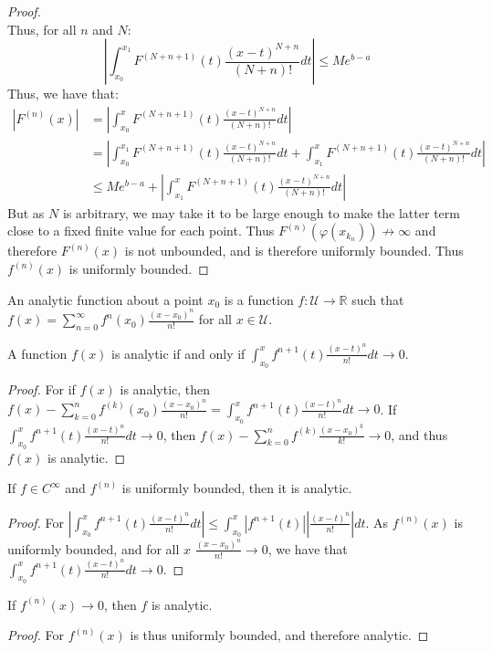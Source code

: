 \begin{proof}
\begin{equation*}
    \end{equation*}
    Thus, for all $n$ and $N$:
    \begin{equation*}
        |\int_{x_0}^{x_1} F^{(N+n+1)}(t)\frac{(x-t)^{N+n}}{(N+n)!}dt|\leq Me^{b-a}
    \end{equation*}
    Thus, we have that:
    \begin{align*}
        |F^{(n)}(x)| &= |\int_{x_0}^{x} F^{(N+n+1)}(t)\frac{(x-t)^{N+n}}{(N+n)!}dt|\\ &= |\int_{x_0}^{x_1} F^{(N+n+1)}(t)\frac{(x-t)^{N+n}}{(N+n)!}dt+\int_{x_1}^{x} F^{(N+n+1)}(t)\frac{(x-t)^{N+n}}{(N+n)!}dt|\\
        &\leq Me^{b-a}+|\int_{x_1}^{x} F^{(N+n+1)}(t)\frac{(x-t)^{N+n}}{(N+n)!}dt|
    \end{align*}
    But as $N$ is arbitrary, we may take it to be large enough to make the latter term close to a fixed finite value for each point. Thus $F^{(n)}(\varphi(x_{k_n}))\not\rightarrow \infty$ and therefore $F^{(n)}(x)$ is not unbounded, and is therefore uniformly bounded. Thus $f^{(n)}(x)$ is uniformly bounded.
    \end{proof}
    \begin{definition}
    An analytic function about a point $x_0$ is a function $f:\mathcal{U}\rightarrow\mathbb{R}$ such that $f(x) = \sum_{n=0}^{\infty} f^{n}(x_0) \frac{(x-x_0)^{n}}{n!}$ for all $x\in\mathcal{U}$.
    \end{definition}
    \begin{theorem}
    A function $f(x)$ is analytic if and only if $\int_{x_0}^{x}f^{n+1}(t)\frac{(x-t)^n}{n!}dt\rightarrow 0$.
    \end{theorem}
    \begin{proof}
    For if $f(x)$ is analytic, then $f(x)-\sum_{k=0}^{n} f^{(k)}(x_0)\frac{(x-x_0)^n}{n!} = \int_{x_0}^{x}f^{n+1}(t)\frac{(x-t)^n}{n!}dt \rightarrow 0$. If $\int_{x_0}^{x}f^{n+1}(t)\frac{(x-t)^n}{n!}dt\rightarrow 0$, then $f(x)-\sum_{k=0}^{n}f^{(k)}\frac{(x-x_0)^{k}}{k!}\rightarrow 0$, and thus $f(x)$ is analytic.
    \end{proof}
    \begin{theorem}
    If $f\in C^{\infty}$ and $f^{(n)}$ is uniformly bounded, then it is analytic.
    \end{theorem}
    \begin{proof}
    For $|\int_{x_0}^{x}f^{n+1}(t)\frac{(x-t)^n}{n!}dt|\leq \int_{x_0}^{x}|f^{n+1}(t)||\frac{(x-t)^n}{n!}|dt$. As $f^{(n)}(x)$ is uniformly bounded, and for all $x$ $\frac{(x-x_0)^n}{n!} \rightarrow 0$, we have that $\int_{x_0}^{x}f^{n+1}(t)\frac{(x-t)^n}{n!}dt\rightarrow 0$.
    \end{proof}
    \begin{theorem}
    If $f^{(n)}(x)\rightarrow 0$, then $f$ is analytic.
    \end{theorem}
    \begin{proof}
    For $f^{(n)}(x)$ is thus uniformly bounded, and therefore analytic.
    \end{proof}
